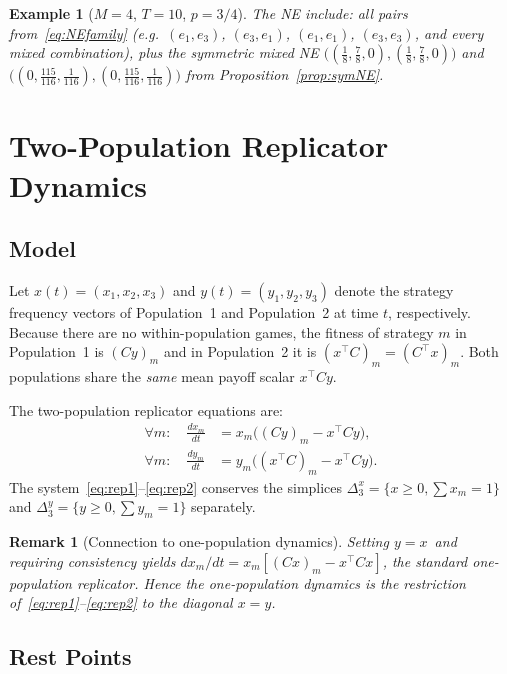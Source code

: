 \documentclass[12pt,a4paper]{article}
\newtheorem{example}{Example}[section]
\newtheorem{remark}{Remark}[section]
\begin{document}
\begin{example}[$M=4$, $T=10$, $p=3/4$]
The NE include: all pairs from~\eqref{eq:NEfamily} (e.g.\ $(e_1,e_3)$,
$(e_3,e_1)$, $(e_1,e_1)$, $(e_3,e_3)$, and every mixed combination),
plus the symmetric mixed NE
$\bigl((\tfrac{1}{8},\tfrac{7}{8},0),(\tfrac{1}{8},\tfrac{7}{8},0)\bigr)$
and
$\bigl((0,\tfrac{115}{116},\tfrac{1}{116}),(0,\tfrac{115}{116},\tfrac{1}{116})\bigr)$
from Proposition~\ref{prop:symNE}.
\end{example}

\section{Two-Population Replicator Dynamics}
\label{sec:rep}

\subsection{Model}

Let $x(t)=(x_1,x_2,x_3)$ and $y(t)=(y_1,y_2,y_3)$ denote the strategy
frequency vectors of Population~1 and Population~2 at time $t$, respectively.
Because there are no within-population games, the fitness of strategy $m$ in
Population~1 is $(Cy)_m$ and in Population~2 it is $(x^\top C)_m=(C^\top x)_m$.
Both populations share the \emph{same} mean payoff scalar $x^\top Cy$.

The two-population replicator equations are:
\begin{align}
  \forall m:\quad \frac{dx_m}{dt} &= x_m\bigl((Cy)_m - x^\top Cy\bigr),
  \label{eq:rep1}\\[4pt]
  \forall m:\quad \frac{dy_m}{dt} &= y_m\bigl((x^\top C)_m - x^\top Cy\bigr).
  \label{eq:rep2}
\end{align}
The system~\eqref{eq:rep1}--\eqref{eq:rep2} conserves the simplices
$\Delta_3^x=\{x\geq 0,\sum x_m=1\}$ and $\Delta_3^y=\{y\geq 0,\sum y_m=1\}$
separately.

\begin{remark}[Connection to one-population dynamics]
Setting $y=x$~and requiring consistency yields $dx_m/dt=x_m[(Cx)_m-x^\top Cx]$,
the standard one-population replicator.  Hence the one-population dynamics is
the restriction of~\eqref{eq:rep1}--\eqref{eq:rep2} to the diagonal $x=y$.
\end{remark}

\subsection{Rest Points}
\end{document}
